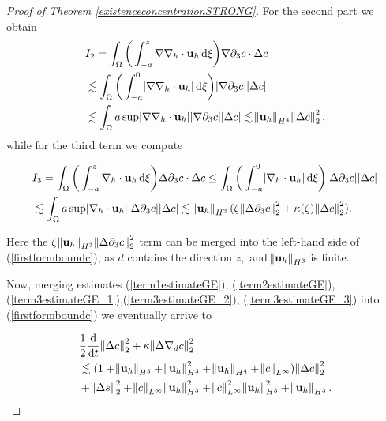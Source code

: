 \documentclass[12pt]{report}
\numberwithin{theorem}{chapter}
\numberwithin{corollary}{chapter}
\numberwithin{lemma}{chapter}
\numberwithin{remark}{chapter}
\numberwithin{definition}{chapter}
\numberwithin{prop}{chapter}
\newcommand*\diff{\mathop{}\!\mathrm{d}}
\begin{document}
\begin{proof}[Proof of Theorem \ref{existenceconcentrationSTRONG}]
For the second part we obtain
%
\begin{equation} \label{term3estimateGE_2}
  \begin{split}
    & I_2 = \int_\Omega \bigg ( \int_{-a}^z \nabla \nabla_h \cdot \mathbf{u}_h \diff \xi \bigg)  \nabla \partial_3 c \cdot \Delta c \\
    & \lesssim \int_\Omega \bigg ( \int_{-a}^0 \abs{\nabla \nabla_h \cdot \mathbf{u}_h} \diff \xi \bigg)  \abs{\nabla \partial_3 c} \abs{\Delta c} \\
    & \lesssim \int_\Omega a \sup \abs{\nabla \nabla_h \cdot \mathbf{u}_h} \abs{\nabla \partial_3 c} \abs{\Delta c} \lesssim \norm{\mathbf{u}_h}_{H^4} \norm{\Delta c}_2^2,
  \end{split}
\end{equation}
%
while for the third term we compute

\begin{equation} \label{term3estimateGE_3}
  \begin{split}
    & I_3 = \int_\Omega \bigg ( \int_{-a}^z \nabla_h \cdot \mathbf{u}_h \diff \xi \bigg) \Delta \partial_3 c  \cdot \Delta c \leq \int_\Omega \bigg ( \int_{-a}^0 \abs{\nabla_h \cdot \mathbf{u}_h} \diff \xi \bigg)  \abs{\Delta \partial_3 c} \abs{\Delta c}\\
    & \lesssim \int_\Omega a \sup{\abs{\nabla_h \cdot \mathbf{u}_h}} \abs{\Delta \partial_3 c} \abs{\Delta c} \lesssim \norm{\mathbf{u}_h}_{H^3} (\zeta \norm{\Delta \partial_3 c}_2^2 + \kappa(\zeta)\norm{\Delta c}_2^2 ).
  \end{split}
\end{equation}

Here the $\zeta \norm{\mathbf{u}_h}_{H^3} \norm{\Delta \partial_3 c}_2^2$ term can be merged into the left-hand side of (\ref{firstformboundc}), as $d$ contains the direction $z,$ and $\norm{\mathbf{u}_h}_{H^3}$ is finite.

Now, merging estimates (\ref{term1estimateGE}), (\ref{term2estimateGE}), (\ref{term3estimateGE_1}),(\ref{term3estimateGE_2}), (\ref{term3estimateGE_3}) into (\ref{firstformboundc}) we eventually arrive to

\begin{equation} \label{Gronwallstructureready}
  \begin{split}
    & \frac{1}{2} \frac{\diff}{\diff t} \norm{\Delta c}_2^2 + \kappa \norm{\Delta \nabla_d c}_2^2 \\
    & \lesssim (1 + \norm{\mathbf{u}_h}_{H^3} + \norm{\mathbf{u}_h}_{H^3}^2 + \norm{\mathbf{u}_h}_{H^4} + \norm{c}_{L^\infty})\norm{\Delta c}_2^2 \\
    & + \norm{\Delta s}_2^2 + \norm{c}_{L^\infty} \norm{\mathbf{u}_h}_{H^3}^2 + \norm{c}_{L^\infty}^2 \norm{\mathbf{u}_h}_{H^3}^2 + \norm{\mathbf{u}_h}_{H^3}.
  \end{split}
\end{equation}


\end{proof}
\end{document}
